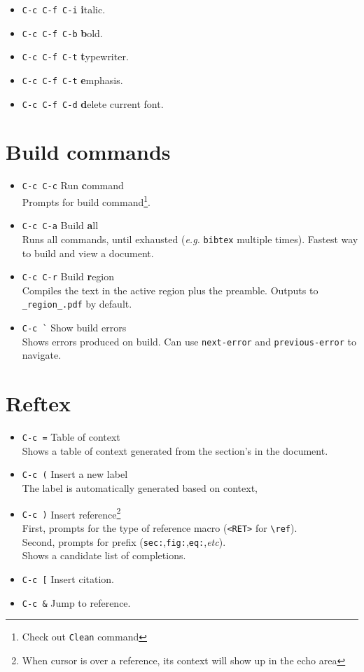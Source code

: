 \documentclass[landscape]{article}
\newcommand{\kbd}[1]{\colorbox{gray!10!}{\texttt{#1}}\hspace{5mm}}
\begin{document}
\begin{multicols}{3}
\begin{itemize}
\item \kbd{C-c C-f C-i} \textbf{i}talic.
\item \kbd{C-c C-f C-b} \textbf{b}old.
\item \kbd{C-c C-f C-t} \textbf{t}ypewriter.
\item \kbd{C-c C-f C-t} \textbf{e}mphasis.
\item \kbd{C-c C-f C-d} \textbf{d}elete current font.
\end{itemize}

\section*{Build commands}

\begin{itemize}
\item \kbd{C-c C-c} Run \textbf{c}ommand \\
  Prompts for build command\footnote{ Check out \texttt{Clean} command}.
\item \kbd{C-c C-a} Build \textbf{a}ll \\
  Runs all commands, until exhausted (\textit{e.g.} \texttt{bibtex} multiple times). Fastest way to build and view a document.
\item \kbd{C-c C-r} Build \textbf{r}egion \\
  Compiles the text in the active region plus the preamble. Outputs to \texttt{\_region\_.pdf} by default.
\item \kbd{C-c \`} Show build errors \\
  Shows errors produced on build. Can use \texttt{next-error} and \texttt{previous-error} to
  navigate.
\end{itemize}

\section*{Reftex}

\begin{itemize}
\item \kbd{C-c =} Table of context \\
  Shows a table of context generated from the section's in the document.
\item \kbd{C-c (} Insert a new label \\
  The label is automatically generated based on context,
\item \kbd{C-c )} Insert reference\footnote{When cursor is over a reference, its context will show
    up in the echo area} \\
  First, prompts for the type of reference macro (\texttt{<RET>} for \texttt{\textbackslash ref}). \\
  Second, prompts for prefix (\texttt{sec:},\texttt{fig:},\texttt{eq:},\textit{etc}). \\
  Shows a candidate list of completions.
\item \kbd{C-c [} Insert citation.
\item \kbd{C-c \&} Jump to reference.
\end{itemize}

\end{multicols}
\end{document}
